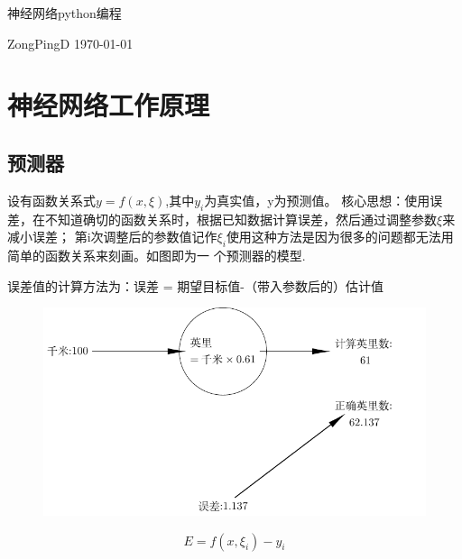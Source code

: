 \documentclass[12pt]{article}
\title{}
\date{\today}
\author{}
\begin{document}
    
    \begin{titlepage}
        \centering
        \vspace{0.2\textheight}  
        {\huge 神经网络python编程}
        \vspace{0.025\textheight}
        \vspace{0.1\textheight}

        {\Large ZongPingD}
        \vfill 
        {\large \today}
        \vspace{0.1\textheight} 
    \end{titlepage}
    \tableofcontents
    \newpage

    \section{神经网络工作原理}
    \subsection{预测器}
    设有函数关系式$y=f(x,\xi)$,其中$y_i$为真实值，y为预测值。
    核心思想：使用误差，在不知道确切的函数关系时，根据已知数据计算误差，然后通过调整参数$\xi$来减小误差；
    第i次调整后的参数值记作$\xi_{i}$使用这种方法是因为很多的问题都无法用简单的函数关系来刻画。如图即为一
    个预测器的模型.
    
    误差值的计算方法为：误差 = 期望目标值-（带入参数后的）估计值
    \begin{figure}[!htb]
        \centering
        \includegraphics[scale=1]{./picture/gapsGenerate.pdf}
    \end{figure}
    \vspace{1em}

    \begin{equation}
         E = f(x,\xi_{i})-y_{i}
    \end{equation}
\end{document}
